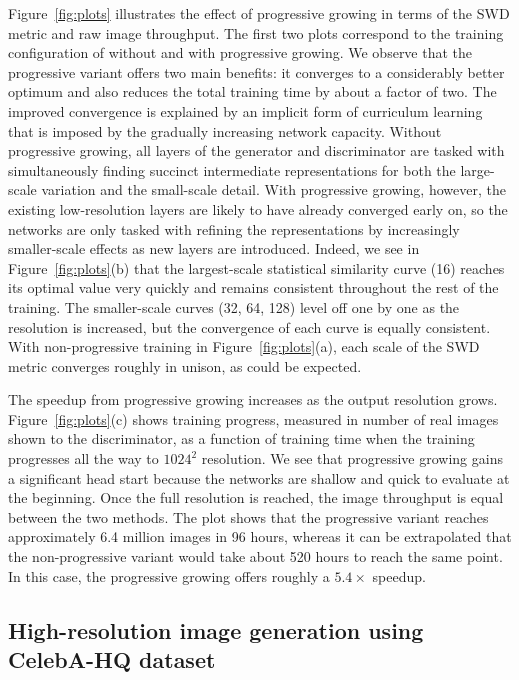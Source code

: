 Figure~\ref{fig:plots} illustrates the effect of progressive growing in terms of the SWD metric and raw image throughput. The first two plots correspond to the training configuration of \cite{Gulrajani2017} without and with progressive growing. We observe that the progressive variant offers two main benefits: it converges to a considerably better optimum and also reduces the total training time by about a factor of two. The improved convergence is explained by an implicit form of curriculum learning that is imposed by the gradually increasing network capacity. Without progressive growing, all layers of the generator and discriminator are tasked with simultaneously finding succinct intermediate representations for both the large-scale variation and the small-scale detail. With progressive growing, however, the existing low-resolution layers are likely to have already converged early on, so the networks are only tasked with refining the representations by increasingly smaller-scale effects as new layers are introduced. Indeed, we see in Figure~\ref{fig:plots}(b) that the largest-scale statistical similarity curve (16) reaches its optimal value very quickly and remains consistent throughout the rest of the training. The smaller-scale curves (32, 64, 128) level off one by one as the resolution is increased, but the convergence of each curve is equally consistent. With non-progressive training in Figure~\ref{fig:plots}(a), each scale of the SWD metric converges roughly in unison, as could be expected.

The speedup from progressive growing increases as the output resolution grows.
Figure~\ref{fig:plots}(c) shows training progress, measured in number of real images shown to the discriminator, as a function of training time when the training progresses all the way to $1024^2$ resolution. We see that progressive growing gains a significant head start because the networks are shallow and quick to evaluate at the beginning. Once the full resolution is reached, the image throughput is equal between the two methods. The plot shows that the progressive variant reaches approximately 6.4 million images in 96 hours, whereas it can be extrapolated that the non-progressive variant would take about 520 hours to reach the same point. In this case, the progressive growing offers roughly a $5.4\times$ speedup.

\subsection{High-resolution image generation using CelebA-HQ dataset}
\label{sec:exp-celeb-hq}

